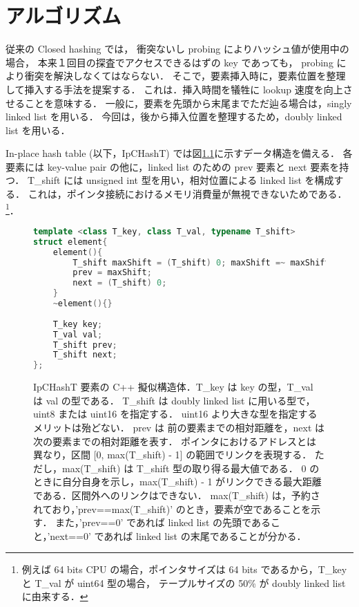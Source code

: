 \chapter{アルゴリズム}
\label{chap_Algorism}

従来の Closed hashing では，
衝突ないし probing によりハッシュ値が使用中の場合，
本来１回目の探査でアクセスできるはずの key であっても，
probing により衝突を解決しなくてはならない．
そこで，要素挿入時に，要素位置を整理して挿入する手法を提案する．
これは．挿入時間を犠牲に lookup 速度を向上させることを意味する．
一般に，要素を先頭から末尾までただ辿る場合は，singly linked list を用いる．
今回は，後から挿入位置を整理するため，doubly linked list を用いる．

In-place hash table (以下，IpCHashT) では図\ref{fig_IpCHashT_struct}に示すデータ構造を備える．
各要素には key-value pair の他に，linked list のための prev 要素と next 要素を持つ．
T\_shift には unsigned int 型を用い，相対位置による linked list を構成する．
これは，ポインタ接続におけるメモリ消費量が無視できないためである．
\footnote{
  例えば 64 bits CPU の場合，ポインタサイズは 64 bits であるから，T\_key と T\_val が uint64 型の場合，
  テープルサイズの 50\% が doubly linked list に由来する．
}．

\begin{figure} %
\begin{lstlisting}[language=C++]
template <class T_key, class T_val, typename T_shift>
struct element{
	element(){
		T_shift maxShift = (T_shift) 0; maxShift =~ maxShift;
		prev = maxShift;
		next = (T_shift) 0;
	}
	~element(){}
	
	T_key key;
	T_val val;
	T_shift prev;
	T_shift next;
};
\end{lstlisting}
\caption{
  IpCHashT 要素の C++ 擬似構造体．T\_key は key の型，T\_val は val の型である．
  T\_shift は doubly linked list に用いる型で，uint8 または uint16 を指定する．
  uint16 より大きな型を指定するメリットは殆どない．
  prev は 前の要素までの相対距離を，next は 次の要素までの相対距離を表す．
  ポインタにおけるアドレスとは異なり，区間 [0, max(T\_shift) - 1] の範囲でリンクを表現する．
  ただし，max(T\_shift) は T\_shift 型の取り得る最大値である．
  0 のときに自分自身を示し，max(T\_shift) - 1 がリンクできる最大距離である．区間外へのリンクはできない．
  max(T\_shift) は，予約されており，'prev==max(T\_shift)' のとき，要素が空であることを示す．
  また，'prev==0' であれば linked list の先頭であること，'next==0' であれば linked list の末尾であることが分かる．
}
\label{fig_IpCHashT_struct}
\end{figure}

